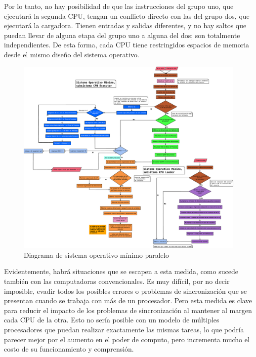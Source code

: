 \documentclass[letterpaper,12pt,oneside]{book}
\begin{document}
	 		Por lo tanto, no hay posibilidad de que las instrucciones
	 		del grupo uno, que ejecutará la segunda CPU, tengan un conflicto directo con las del grupo dos, que ejecutará la cargadora. 
	 		Tienen entradas y salidas diferentes, y no hay saltos que puedan llevar de alguna etapa del grupo uno a alguna
	 		del dos; son totalmente independientes. De esta forma, cada CPU tiene restringidos espacios de memoria desde el mismo diseño 
	 		del sistema operativo.
	 		
	 		

			\begin{figure}[h]		
				\centering
				\includegraphics[width=\textwidth,height=\textheight,keepaspectratio]{media/Paralela/Diagrama_Flujo_SO_Parallel.eps}
				\caption{ Diagrama de sistema operativo mínimo paralelo }
				\label{fig:diag_so_parallel}
			\end{figure}	 	
	 	
     		Evidentemente, habrá situaciones que se escapen a esta medida, como sucede también con las computadoras convencionales. Es muy difícil, por
     		no decir imposible, evadir todos los posibles errores o problemas de sincronización que se presentan cuando se trabaja con más de un 
     		procesador. Pero esta medida 
     		es clave para reducir el impacto de los problemas de sincronización al mantener al margen cada CPU de la otra. Esto
     		no sería posible con un modelo de múltiples procesadores que puedan realizar exactamente las mismas tareas, lo
     		que podría parecer mejor por el aumento en el poder de computo, pero
     		incrementa mucho el costo de su funcionamiento y  comprensión.
	 	
\end{document}
